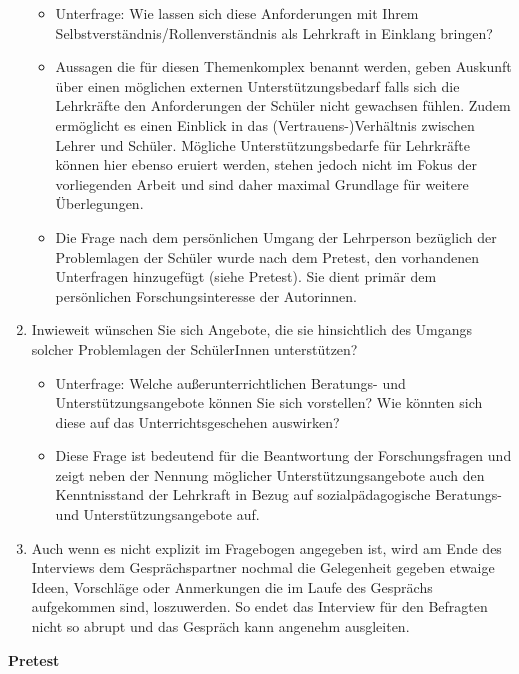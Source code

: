 \begin{enumerate}
	\begin{itemize}
		\item Unterfrage: Wie lassen sich diese Anforderungen mit Ihrem Selbstverständnis/Rollenverständnis als Lehrkraft in Einklang bringen?
		\item Aussagen die für diesen Themenkomplex benannt werden, geben Auskunft über einen möglichen externen Unterstützungsbedarf falls sich die Lehrkräfte den Anforderungen der Schüler nicht gewachsen fühlen. Zudem ermöglicht es einen Einblick in das (Vertrauens-)Verhältnis zwischen Lehrer und Schüler. Mögliche Unterstützungsbedarfe für Lehrkräfte können hier ebenso eruiert werden, stehen jedoch nicht im Fokus der vorliegenden Arbeit und sind daher maximal Grundlage für weitere Überlegungen.
		\item Die Frage nach dem persönlichen Umgang der Lehrperson bezüglich der Problemlagen der Schüler wurde nach dem Pretest, den vorhandenen Unterfragen hinzugefügt (siehe Pretest). Sie dient primär dem persönlichen Forschungsinteresse der Autorinnen.
	\end{itemize}
	\item Inwieweit wünschen Sie sich Angebote, die sie hinsichtlich des Umgangs solcher Problemlagen der SchülerInnen unterstützen?
	\begin{itemize}
		\item Unterfrage: Welche außerunterrichtlichen Beratungs- und Unterstützungsangebote können Sie sich vorstellen? Wie könnten sich diese auf das Unterrichtsgeschehen auswirken?
		\item Diese Frage ist bedeutend für die Beantwortung der Forschungsfragen und zeigt neben der Nennung möglicher Unterstützungsangebote auch den Kenntnisstand der Lehrkraft in Bezug auf sozialpädagogische Beratungs- und Unterstützungsangebote auf.
		\end{itemize}
	\item Auch wenn es nicht explizit im Fragebogen angegeben ist, wird am Ende des Interviews dem Gesprächspartner nochmal die Gelegenheit gegeben etwaige Ideen, Vorschläge oder Anmerkungen die im Laufe des Gesprächs aufgekommen sind, loszuwerden. So endet das Interview für den Befragten nicht so abrupt und das Gespräch kann angenehm ausgleiten.
	
\end{enumerate}

\textbf{Pretest}\\

